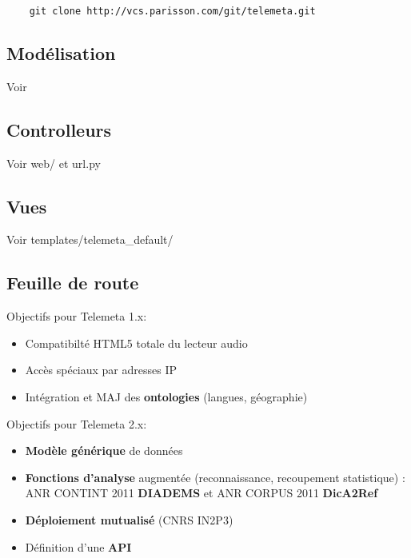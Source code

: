 \documentclass[a4paper,11pt,french]{article}
\begin{document}
  \begin{verbatim}
	git clone http://vcs.parisson.com/git/telemeta.git
  \end{verbatim}



\subsection{Modélisation}

Voir 

\subsection{Controlleurs}

Voir web/ et url.py

\subsection{Vues}

Voir templates/telemeta\_default/


\subsection{Feuille de route}

Objectifs pour Telemeta 1.x:

\begin{itemize}
 \item Compatibilté HTML5 totale du lecteur audio
 \item Accès spéciaux par adresses IP
 \item Intégration et MAJ des \textbf{ontologies} (langues, géographie)
\end{itemize}
\vspace{0.3cm}

Objectifs pour Telemeta 2.x:
\begin{itemize}
 \item \textbf{Modèle générique} de données
 \item \textbf{Fonctions d'analyse} augmentée (reconnaissance, recoupement statistique) : ANR CONTINT 2011 \textbf{DIADEMS} et ANR CORPUS 2011 \textbf{DicA2Ref}
 \item \textbf{Déploiement mutualisé} (CNRS IN2P3)
 \item Définition d'une \textbf{API}
\end{itemize}
\end{document}
